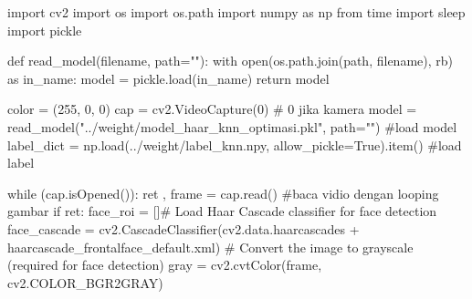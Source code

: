 \documentclass[
  letterpaper,
  DIV=11,
  numbers=noendperiod]{scrreprt}
\newenvironment{Shaded}{\begin{snugshade}}{\end{snugshade}}
\newcommand{\BuiltInTok}[1]{\textcolor[rgb]{0.00,0.23,0.31}{#1}}
\newcommand{\CommentTok}[1]{\textcolor[rgb]{0.37,0.37,0.37}{#1}}
\newcommand{\ControlFlowTok}[1]{\textcolor[rgb]{0.00,0.23,0.31}{#1}}
\newcommand{\DecValTok}[1]{\textcolor[rgb]{0.68,0.00,0.00}{#1}}
\newcommand{\ImportTok}[1]{\textcolor[rgb]{0.00,0.46,0.62}{#1}}
\newcommand{\KeywordTok}[1]{\textcolor[rgb]{0.00,0.23,0.31}{#1}}
\newcommand{\NormalTok}[1]{\textcolor[rgb]{0.00,0.23,0.31}{#1}}
\newcommand{\OperatorTok}[1]{\textcolor[rgb]{0.37,0.37,0.37}{#1}}
\newcommand{\StringTok}[1]{\textcolor[rgb]{0.13,0.47,0.30}{#1}}
\newcommand{\VariableTok}[1]{\textcolor[rgb]{0.07,0.07,0.07}{#1}}
\begin{document}
\begin{Shaded}
\begin{Highlighting}[]
\ImportTok{import}\NormalTok{ cv2}
\ImportTok{import}\NormalTok{ os}
\ImportTok{import}\NormalTok{ os.path}
\ImportTok{import}\NormalTok{ numpy }\ImportTok{as}\NormalTok{ np}
\ImportTok{from}\NormalTok{ time }\ImportTok{import}\NormalTok{ sleep}
\ImportTok{import}\NormalTok{ pickle}

\KeywordTok{def}\NormalTok{ read\_model(filename, path}\OperatorTok{=}\StringTok{""}\NormalTok{):}
    \ControlFlowTok{with} \BuiltInTok{open}\NormalTok{(os.path.join(path, filename), }\StringTok{\textquotesingle{}rb\textquotesingle{}}\NormalTok{) }\ImportTok{as}\NormalTok{ in\_name:}
\NormalTok{        model }\OperatorTok{=}\NormalTok{ pickle.load(in\_name)}
        \ControlFlowTok{return}\NormalTok{ model}
    

\NormalTok{color }\OperatorTok{=}\NormalTok{ (}\DecValTok{255}\NormalTok{, }\DecValTok{0}\NormalTok{, }\DecValTok{0}\NormalTok{)}
\NormalTok{cap }\OperatorTok{=}\NormalTok{ cv2.VideoCapture(}\DecValTok{0}\NormalTok{) }\CommentTok{\# 0 jika kamera}
\NormalTok{model }\OperatorTok{=}\NormalTok{ read\_model(}\StringTok{"../weight/model\_haar\_knn\_optimasi.pkl"}\NormalTok{, path}\OperatorTok{=}\StringTok{""}\NormalTok{) }\CommentTok{\#load model}
\NormalTok{label\_dict }\OperatorTok{=}\NormalTok{ np.load(}\StringTok{\textquotesingle{}../weight/label\_knn.npy\textquotesingle{}}\NormalTok{, allow\_pickle}\OperatorTok{=}\VariableTok{True}\NormalTok{).item() }\CommentTok{\#load label}


\ControlFlowTok{while}\NormalTok{ (cap.isOpened()):}
\NormalTok{    ret , frame }\OperatorTok{=}\NormalTok{ cap.read() }\CommentTok{\#baca vidio dengan looping gambar}
    \ControlFlowTok{if}\NormalTok{ ret:}
\NormalTok{        face\_roi }\OperatorTok{=}\NormalTok{ []}\CommentTok{\# Load Haar Cascade classifier for face detection}
\NormalTok{        face\_cascade }\OperatorTok{=}\NormalTok{ cv2.CascadeClassifier(cv2.data.haarcascades }\OperatorTok{+} \StringTok{\textquotesingle{}haarcascade\_frontalface\_default.xml\textquotesingle{}}\NormalTok{)}
        \CommentTok{\# Convert the image to grayscale (required for face detection)}
\NormalTok{        gray }\OperatorTok{=}\NormalTok{ cv2.cvtColor(frame, cv2.COLOR\_BGR2GRAY)}


\end{Highlighting}
\end{Shaded}
\end{document}
